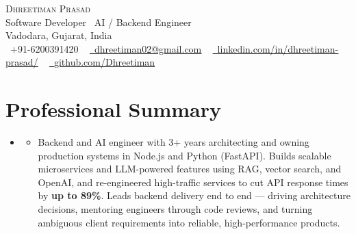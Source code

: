 \documentclass[letterpaper,11pt]{article}
\newcommand{\resumeSubHeadingListStart}{\begin{itemize}[leftmargin=0.0in, label={}]}
\newcommand{\resumeSubHeadingListEnd}{\end{itemize}}
\begin{document}
\begin{center}
    {\Huge \scshape Dhreetiman Prasad} \\ \vspace{3pt}
    {\normalsize Software Developer \textbar\ AI / Backend Engineer} \\ \vspace{3pt}
    Vadodara, Gujarat, India \\ \vspace{3pt}
    \small \raisebox{-0.1\height}\faPhone\ +91-6200391420 ~ 
    \href{mailto:dhreetiman02@gmail.com}{\raisebox{-0.2\height}\faEnvelope\ \underline{dhreetiman02@gmail.com}} ~ 
    \href{https://www.linkedin.com/in/dhreetiman-prasad/}{\raisebox{-0.2\height}\faLinkedin\ \underline{linkedin.com/in/dhreetiman-prasad/}}  ~
    \href{https://github.com/Dhreetiman}{\raisebox{-0.2\height}\faGithub\ \underline{github.com/Dhreetiman}}
    \vspace{-8pt}
\end{center}

\section{Professional Summary}
  \resumeSubHeadingListStart
    \item
      \begin{itemize}
        \item \small{Backend and AI engineer with 3+ years architecting and owning production systems in Node.js and Python (FastAPI). Builds scalable microservices and LLM-powered features using RAG, vector search, and OpenAI, and re-engineered high-traffic services to cut API response times by \textbf{up to 89\%}. Leads backend delivery end to end --- driving architecture decisions, mentoring engineers through code reviews, and turning ambiguous client requirements into reliable, high-performance products.}
      \end{itemize}
  \resumeSubHeadingListEnd

\end{document}
